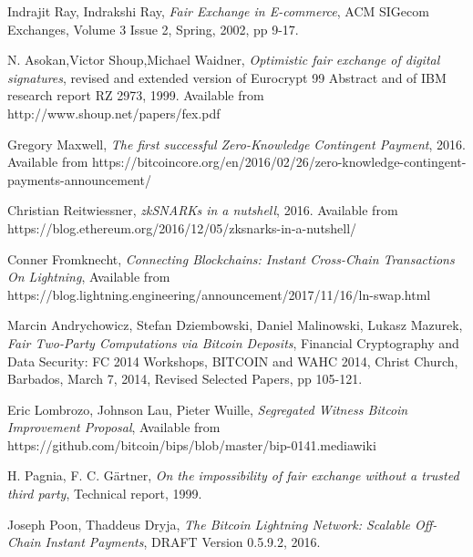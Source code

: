 \documentclass[]{article}
\begin{document}
\begin{thebibliography}{9}
	Indrajit Ray, Indrakshi Ray, 
	\textit{Fair Exchange in E-commerce},
	ACM SIGecom Exchanges, Volume 3 Issue 2, Spring, 2002,
	pp 9-17. 
	
	    N. Asokan,Victor Shoup,Michael Waidner,
	    \textit{Optimistic fair exchange of digital signatures},
	    revised and extended version of Eurocrypt 99 Abstract and of IBM research report RZ 2973, 1999. Available from http://www.shoup.net/papers/fex.pdf
		
	Gregory Maxwell,
	\textit{The first successful Zero-Knowledge Contingent Payment}, 2016.
	Available from https://bitcoincore.org/en/2016/02/26/zero-knowledge-contingent-payments-announcement/
	
	Christian Reitwiessner,
	\textit{zkSNARKs in a nutshell}, 2016.
	Available from
	https://blog.ethereum.org/2016/12/05/zksnarks-in-a-nutshell/
	
	Conner Fromknecht,
	\textit{Connecting Blockchains: Instant Cross-Chain Transactions On Lightning},
	Available from https://blog.lightning.engineering/announcement/2017/11/16/ln-swap.html
	
	Marcin Andrychowicz, Stefan Dziembowski, Daniel Malinowski, Lukasz Mazurek,
	\textit{Fair Two-Party Computations via Bitcoin Deposits}, Financial Cryptography and Data Security: FC 2014 Workshops, BITCOIN and WAHC 2014, Christ Church, Barbados, March 7, 2014, Revised Selected Papers, pp 105-121.
	
	Eric Lombrozo, Johnson Lau, Pieter Wuille,
	\textit{Segregated Witness Bitcoin Improvement Proposal},
	Available from https://github.com/bitcoin/bips/blob/master/bip-0141.mediawiki
	
	H. Pagnia, F. C. Gärtner, 
	\textit{On the impossibility of fair exchange without a trusted
	third party}, Technical report, 1999.

	Joseph Poon, Thaddeus Dryja,
	\textit{The Bitcoin Lightning Network: Scalable Off-Chain Instant Payments}, DRAFT Version 0.5.9.2, 2016.
	    
\end{thebibliography}
\end{document}
